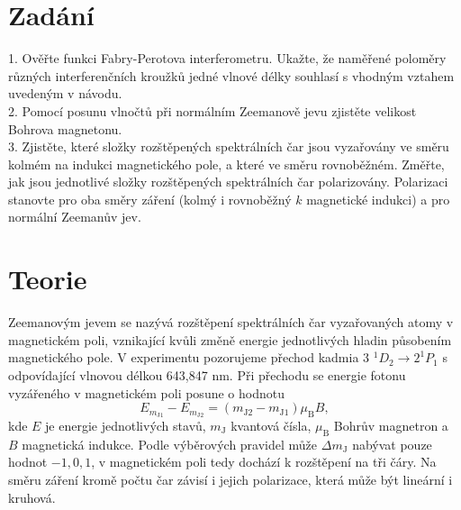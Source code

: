 \documentclass[czech,11pt,a4paper]{article}
\begin{document}
	\begin{multicols}{2}
		\section{Zadání}
	
1. Ověřte funkci Fabry-Perotova interferometru. Ukažte, že naměřené poloměry různých interferenčních kroužků jedné vlnové délky souhlasí s vhodným vztahem uvedeným v návodu. \\
2. Pomocí posunu vlnočtů při normálním Zeemanově jevu zjistěte velikost Bohrova magnetonu.\\
3. Zjistěte, které složky rozštěpených spektrálních čar jsou vyzařovány ve směru kolmém na indukci magnetického pole, a které ve směru rovnoběžném. Změřte, jak jsou jednotlivé složky rozštěpených spektrálních čar polarizovány. Polarizaci stanovte pro oba směry záření (kolmý i rovnoběžný \(k\) magnetické indukci) a pro normální Zeemanův jev. \\

		\section{Teorie}
		Zeemanovým jevem se nazývá rozštěpení spektrálních čar vyzařovaných atomy v magnetickém poli, vznikající kvůli změně energie jednotlivých hladin působením magnetického pole. V experimentu pozorujeme přechod kadmia 3 $^1D_2\rightarrow 2 ^1P_1$ s odpovídající vlnovou délkou 643,847 nm. Při přechodu se energie fotonu vyzářeného v magnetickém poli posune o hodnotu 
		\begin{equation}
			E_{m_\mathrm{J 1}}-E_{m_\mathrm{J 2}}=\left(m_\mathrm{J 2}-m_\mathrm{J 1}\right) \mu_{\mathrm{B}} B,
		\end{equation}
		kde $E$ je energie jednotlivých stavů, $m_\mathrm{J}$ kvantová čísla, $\mu_\mathrm{B}$ Bohrův magnetron a $B$ magnetická indukce. Podle výběrových pravidel může $\Delta m_\mathrm{J}$ nabývat pouze hodnot $-1,0,1$, v magnetickém poli tedy dochází k rozštěpení na tři čáry. Na směru záření kromě počtu čar závisí i jejich polarizace, která může být lineární i kruhová.
		

\end{multicols}
\end{document}
